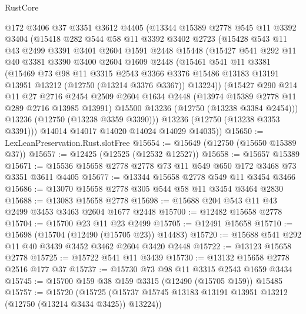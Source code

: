 \begin{lexlean}{RustCore}
\begin{coremodule}
    @172
    @3406
    @37
    @3351
    @3612
    @4405
    (@13344
      @15389
      @2778
      @545
      @11
      @3392
      @3404
      (@15418
        @282
        @544
        @58
        @11
        @3392
        @3402
        @2723
        (@15428
          @543
          @11
          @43
          @2499
          @3391
          @3401
          @2604
          @1591
          @2448
          @15448
          (@15427
            @541
            @292
            @11
            @40
            @3381
            @3390
            @3400
            @2604
            @1609
            @2448
            (@15461
              @541
              @11
              @3381
              (@15469
                @73
                @98
                @11
                @3315
                @2543
                @3366
                @3376
                @15486
                @13183
                @13191
                @13951
                @13212
                (@12750 (@13214 @3376 @3367))
                @13224))
            (@15427
              @290
              @214
              @11
              @27
              @2716
              @2454
              @2509
              @2604
              @1634
              @2448
              (@13974 @15389 @2778 @11 @289 @2716 @13985 @13991)
              @15500
              @13236
              (@12750 (@13238 @3384 @2454)))
            @13236
            (@12750 (@13238 @3359 @3390)))
          @13236
          (@12750 (@13238 @3353 @3391)))
        @14014
        @14017
        @14020
        @14024
        @14029
        @14035))
@15650 := LexLeanPreservation.Rust.slotFree
@15654 := @15649 (@12750 (@15650 @15389 @37))
@15657 := @12425 (@12525 (@12532 @12527))
@15658 := @15657 @15389
@15671 := @15536 @15658 @2778 @2778 @73 @11 @549 @650 @172 @3468 @73 @3351 @3611 @4405
@15677 := @13344 @15658 @2778 @549 @11 @3454 @3466
@15686 := @13070 @15658 @2778 @305 @544 @58 @11 @3454 @3464 @2830
@15688 := @13083 @15658 @2778
@15698 := @15688 @204 @543 @11 @43 @2499 @3453 @3463 @2604 @1677 @2448
@15700 := @12482 @15658 @2778
@15704 := @15700 @23 @11 @23 @2499
@15705 := @12491 @15658
@15710 := @15698 (@15704 (@12490 (@15705 @23)) @14483)
@15720 := @15688 @541 @292 @11 @40 @3439 @3452 @3462 @2604 @3420 @2448
@15722 := @13123 @15658 @2778
@15725 := @15722 @541 @11 @3439
@15730 := @13132 @15658 @2778 @2516 @177 @37
@15737 := @15730 @73 @98 @11 @3315 @2543 @1659 @3434
@15745 := @15700 @159 @38 @159 @3315 (@12490 (@15705 @159)) @15485
@15757 := @15720
    (@15725 (@15737 @15745 @13183 @13191 @13951 @13212 (@12750 (@13214 @3434 @3425)) @13224))

\end{coremodule}
\end{lexlean}

